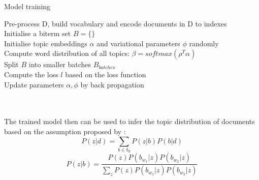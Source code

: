 \begin{algorithm}[!htbp]
    \caption{Model training}
    \label{alg:ebtm}
    \LinesNumbered 
    Pre-process D, build vocabulary and encode documents in D to indexes \\
    Initialise a biterm set $B = \{\}$ \\
    Initialise topic embeddings $\alpha$ and variational parameters $\phi$ randomly \\
    {
        Compute word distribution of all topics: $\beta = softmax(\rho^T\alpha) $\\
        Split $B$ into smaller batches $B_{batches}$\\
        Compute the loss $l$ based on the loss function \\
        Update parameters $\alpha, \phi$ by back propagation
    }
\end{algorithm}
\\\\The trained model then can be used to infer the topic distribution of documents based on the assumption proposed by \cite{yan2013biterm}:
\begin{equation}
    P(z|d) = \sum_{b\in b_d}P(z|b)P(b|d)
\label{eq:doc1}
\end{equation}
\begin{equation}
    P(z|b) = \frac{P(z)P(b_{w_1}|z)P(b_{w_2}|z)}{\sum_zP(z)P(b_{w_1}|z)P(b_{w_2}|z)}
\label{eq:doc2}
\end{equation}

